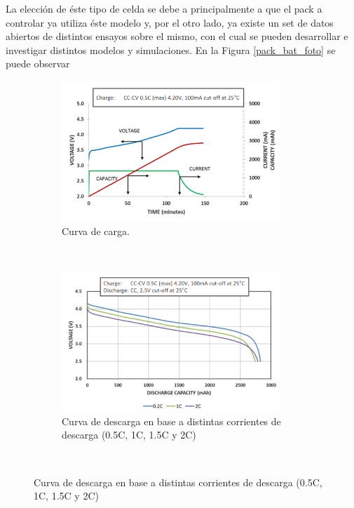 \documentclass[10pt,a4paper]{article}
\begin{document}
La elecci\'on de \'este tipo de celda se debe a principalmente a que el pack a
controlar ya utiliza \'este modelo y, por el otro lado, ya existe un set de 
datos abiertos \cite{Kollmeyer2018} de distintos ensayos sobre el
mismo, con el cual se pueden desarrollar e investigar distintos modelos y 
simulaciones. En la Figura \ref{pack_bat_foto} se puede observar 

\begin{figure}[h!]
    \begin{subfigure}[t]{.5\textwidth}
	\includegraphics[width=0.9\textwidth]{cc_cv_18650.png}
	\caption{Curva de carga.}
	\label{cc_cv_18650}
    \end{subfigure}%
    ~ 
    \begin{subfigure}[t]{.5\textwidth}
	\includegraphics[width=0.9\textwidth]{discharge_18650.png}
	\caption{Curva de descarga en base a distintas corrientes de descarga (0.5C,
	1C, 1.5C y 2C)}
	\label{descarga_18650}
    \end{subfigure}
    ~ 
    \begin{centering}

\end{centering}
\end{figure}
\end{document}
